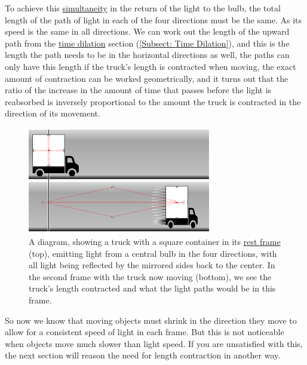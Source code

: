 To achieve this \hyperlink{def-simultaneity}{simultaneity} in the return of the light to the bulb, the total length of the path of light in each of the four directions must be the same.
As its speed is the same in all directions.
We can work out the length of the upward path from the \hyperlink{def-time-dilation}{time dilation} section (\ref{Subsect: Time Dilation}), and this is the length the path needs to be in the horizontal directions as well, the paths can only have this length if the truck's length is contracted when moving, the exact amount of contraction can be worked geometrically, and it turns out that the ratio of the increase in the amount of time that passes before the light is reabsorbed is inversely proportional to the amount the truck is contracted in the direction of its movement.

\begin{figure}[H]
	\centering
	\includegraphics[width = 8cm]{images/pdf/Full_Lorry_Transform.pdf}
	\caption{A diagram, showing a truck with a square container in its \protect\hyperlink{def-proper-frame}{rest frame} (top), emitting light from a central bulb in the four directions, with all light being reflected by the mirrored sides back to the center. In the second frame with the truck now moving (bottom), we see the truck's length contracted and what the light paths would be in this frame.}
	\label{fig: full truck transform}
\end{figure}

So now we know that moving objects must shrink in the direction they move to allow for a consistent speed of light in each frame.
But this is not noticeable when objects move much slower than light speed.
If you are unsatisfied with this, the next section will reason the need for length contraction in another way.


